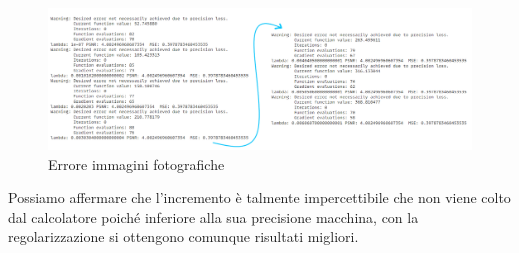 \begin{figure}[H]
    \centering
    \includegraphics[width=\textwidth]{output/outputERROR.png}
    \caption{Errore immagini fotografiche}
    \label{fig:errorOutput}
\end{figure}

Possiamo affermare che l'incremento è talmente impercettibile che non viene colto dal calcolatore poiché inferiore alla sua precisione macchina, con la regolarizzazione si ottengono comunque risultati migliori. 
